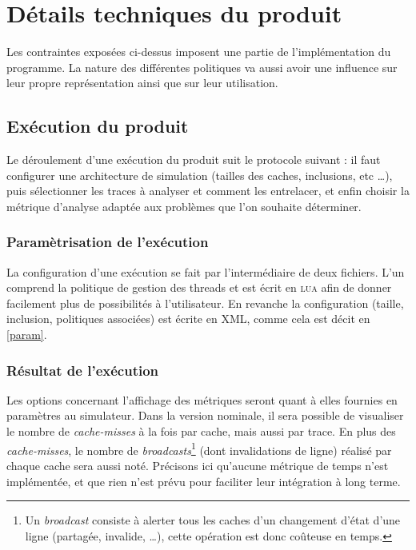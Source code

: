 \section{Détails techniques du produit}

Les contraintes exposées ci-dessus imposent une partie de l'implémentation du programme. La nature des différentes politiques va aussi avoir une influence sur leur propre représentation ainsi que sur leur utilisation.

\subsection{Exécution du produit}

Le déroulement d'une exécution du produit suit le protocole suivant : il faut configurer une architecture de simulation (tailles des caches, inclusions, etc \ldots), puis sélectionner les traces à analyser et comment les entrelacer, et enfin choisir la métrique d'analyse adaptée aux problèmes que l'on souhaite déterminer.

\subsubsection{Paramètrisation de l'exécution}

La configuration d'une exécution se fait par l'intermédiaire de deux fichiers. L'un comprend la politique de gestion des threads et est écrit en \textsc{lua} afin de donner facilement plus de possibilités à l'utilisateur. En revanche la configuration (taille, inclusion, politiques associées) est écrite en \textsc{XML}, comme cela est décit en \ref{param}.

\subsubsection{Résultat de l'exécution}
\label{métriques}

Les options concernant l'affichage des métriques seront quant à elles fournies en paramètres au simulateur. Dans la version nominale, il sera possible de visualiser le nombre de \emph{cache-misses} à la fois par cache, mais aussi par trace. En plus des \emph{cache-misses}, le nombre de \emph{broadcasts}\footnote{Un \emph{broadcast} consiste à alerter tous les caches d'un changement d'état d'une ligne (partagée, invalide, \ldots), cette opération est donc coûteuse en temps.} (dont invalidations de ligne) réalisé par chaque cache sera aussi noté. Précisons ici qu'aucune métrique de temps n'est implémentée, et que rien n'est prévu pour faciliter leur intégration à long terme.

